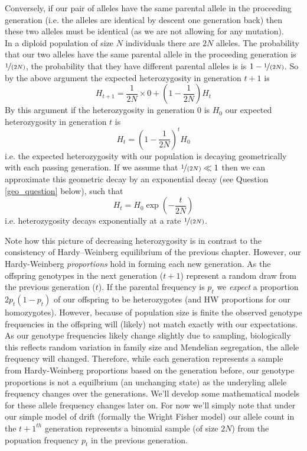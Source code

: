 Conversely, if our pair of alleles have the same parental allele in
the proceeding generation (i.e. the alleles are identical by descent
one generation back) then these two alleles must be identical (as we
are not allowing for any mutation). \\

In a diploid population of size $N$ individuals there are $2N$ alleles. The
probability that our two alleles have the same parental allele in the
proceeding generation is $\nicefrac{1}{(2N)}$, the probability that they have
different parental alleles is is $1-\nicefrac{1}{(2N)}$. So by the above
argument the expected heterozygosity in generation $t+1$ is
%
\begin{equation}
H_{t+1} = \frac{1}{2N} \times 0 + \left(1-\frac{1}{2N} \right)H_t
\end{equation}
%
By this argument if the heterozygosity in generation $0$ is $H_0$ our
expected heterozygosity in generation $t$ is
%
\begin{equation}
H_t = \left(1-\frac{1}{2N} \right)^tH_0
\end{equation}
%
i.e. the expected heterozygosity with our population is decaying
geometrically with each passing generation. If we assume that $\nicefrac{1}{(2N)}
\ll 1$ then we can approximate this geometric decay by an exponential
decay (see Question \ref{geo_question} below), such that
%
\begin{equation}
H_t =H_0 \exp \left(-\frac{t}{2N} \right)  
\end{equation}
%
i.e. heterozygosity decays exponentially at a rate
$\nicefrac{1}{(2N)}$.

Note how this picture of decreasing heterozygosity is in contrast to the
consistency of Hardy--Weinberg equilibrium of the previous chapter. 
However, our Hardy-Weinberg \emph{proportions} hold in forming each new
generation. As the offspring genotypes in the next generation ($t+1$) represent a random
draw from the previous generation ($t$). If the parental frequency is $p_t$ we
\emph{expect} a proportion $2p_t(1-p_t)$ of our offspring to be
heterozygotes (and HW proportions for our homozygotes). However, because of population size is finite the
observed genotype frequencies in the offspring will (likely) not match exactly with our
expectations. As our genotype frequencies likely change slightly due
to sampling, biologically this reflects random variation in family size
and Mendelian segregation, the allele frequency will changed. 
Therefore, while each generation represents a sample from
Hardy-Weinberg proportions based on the generation before, our
genotype proportions is not a equilbrium (an unchanging state) as the
underyling allele frequency changes over the generations. We'll develop some mathematical models for these allele
frequency changes later on. For now we'll simply note that
under our simple model of drift (formally the Wright Fisher model) our
allele count in the $t+1^{th}$ generation represents a binomial sample
(of size $2N$) from the popuation frequency $p_t$ in the previous
generation.  


